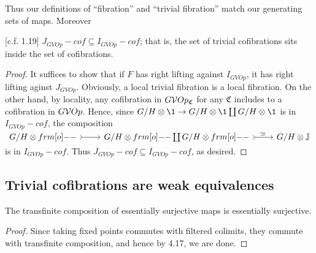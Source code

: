 \documentclass[psamsfonts,onesided,10pt,letterpaper]{amsart}%
\renewcommand{\C}{\ensuremath{\mathfrak{C}}}
\newcommand{\J}{\ensuremath{\mathbb{J}}}
\begin{document}
Thus our definitions of ``fibration'' and ``trivial fibration'' match our generating sets of maps. Moreover
\begin{lemma}
  \label{POINT_4_LEMMA}
  [c.f. \cite{CM1} 1.19]
  $J_{GVOp}-cof \subseteq I_{GVOp}-cof$; that is, the set of trivial cofibrations sits inside the set of cofibrations.
\end{lemma}
\begin{proof}
  It suffices to show that if $F$ has right lifting against $I_{GVOp}$, it has right lifting aginst $J_{GVOp}$. Obviously, a local trivial fibration is a local fibration. On the other hand, by locality, any cofibration in $G\V Op_\C$ for any $\C$ includes to a cofibration in $G\mathcal V Op$. Hence, since $G/H\otimes \1 \to G/H\otimes \1 \coprod G/H\otimes \1$ is in $I_{GVOp}-cof$, the composition
$
\begin{tikzcd}
 G/H\otimes \1 \arrow[r, rightarrowtail] & G/H\otimes \1 \coprod G/H\otimes \1 \arrow[r, rightarrowtail, "\simeq"] & G/H\otimes \J 
\end{tikzcd}
$
is in $I_{GVOp}-cof$. Thus $J_{GVOp}-cof \subseteq I_{GVOp}-cof$, as desired.
\end{proof}

\subsection{Trivial cofibrations are weak equivalences}

\begin{lemma}
  The transfinite composition of essentially surjective maps is essentially surjective.
\end{lemma}
\begin{proof}
  Since taking fixed points commutes with filtered colimits, they commute with transfinite composition, and hence by \cite{Cav14} 4.17, we are done.
\end{proof}
\end{document}
